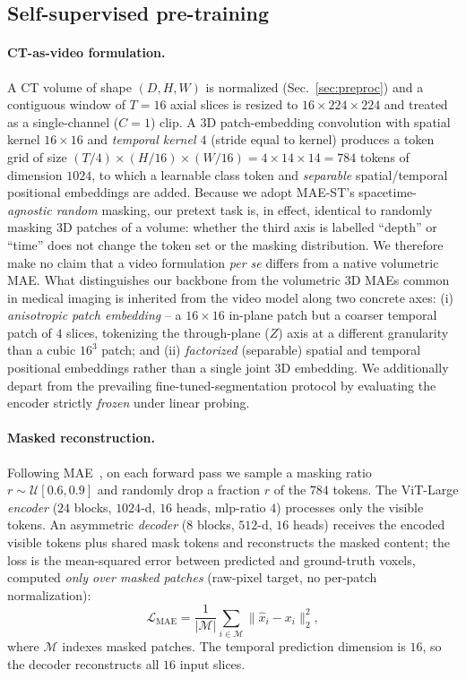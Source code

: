 \documentclass[runningheads]{llncs}
\begin{document}
\subsection{Self-supervised pre-training}

\paragraph{CT-as-video formulation.}
A CT volume of shape $(D,H,W)$ is normalized (Sec.~\ref{sec:preproc}) and a
contiguous window of $T{=}16$ axial slices is resized to $16{\times}224{\times}224$
and treated as a single-channel ($C{=}1$) clip. A 3D patch-embedding convolution
with spatial kernel $16{\times}16$ and \emph{temporal kernel $4$} (stride equal
to kernel) produces a token grid of size $(T/4)\times(H/16)\times(W/16)=
4{\times}14{\times}14=784$ tokens of dimension $1024$, to which a learnable
class token and \emph{separable} spatial/temporal positional embeddings are
added.
Because we adopt MAE-ST's spacetime-\emph{agnostic random} masking, our pretext
task is, in effect, identical to randomly masking 3D patches of a volume:
whether the third axis is labelled ``depth'' or ``time'' does not change the
token set or the masking distribution. We therefore make no claim that a video
formulation \emph{per se} differs from a native volumetric MAE. What
distinguishes our backbone from the volumetric 3D MAEs common in medical imaging
is inherited from the video model along two concrete axes: (i) \emph{anisotropic
patch embedding} -- a $16{\times}16$ in-plane patch but a coarser temporal patch
of $4$ slices, tokenizing the through-plane ($Z$) axis at a different granularity
than a cubic $16^3$ patch; and (ii) \emph{factorized} (separable) spatial and
temporal positional embeddings rather than a single joint 3D embedding. We
additionally depart from the prevailing fine-tuned-segmentation protocol by
evaluating the encoder strictly \emph{frozen} under linear probing.

\paragraph{Masked reconstruction.}
Following MAE~\cite{mae,maest}, on each forward pass we sample a masking ratio
$r\sim\mathcal{U}[0.6,0.9]$ and randomly drop a fraction $r$ of the $784$ tokens.
The ViT-Large \emph{encoder} ($24$ blocks, $1024$-d, $16$ heads,
mlp-ratio $4$) processes only the visible tokens. An asymmetric
\emph{decoder} ($8$ blocks, $512$-d, $16$ heads) receives the encoded visible
tokens plus shared mask tokens and reconstructs the masked content; the loss is
the mean-squared error between predicted and ground-truth voxels, computed
\emph{only over masked patches} (raw-pixel target, no per-patch normalization):
\[
\mathcal{L}_{\text{MAE}}
= \frac{1}{|\mathcal{M}|}\sum_{i\in\mathcal{M}}\big\lVert \hat{x}_i - x_i \big\rVert_2^2 ,
\]
where $\mathcal{M}$ indexes masked patches. The temporal prediction dimension is
$16$, so the decoder reconstructs all $16$ input slices.
\end{document}
